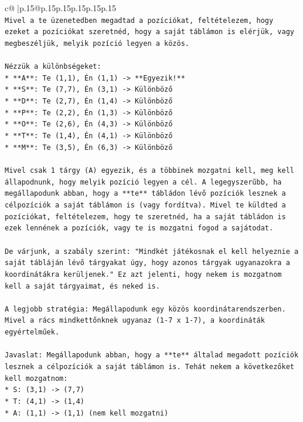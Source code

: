 \documentclass{article}
\begin{document}
{\begin{supertabular}{c@{$\;$}|p{.15\linewidth}@{}p{.15\linewidth}p{.15\linewidth}p{.15\linewidth}p{.15\linewidth}p{.15\linewidth}}
{{{\\ 
\texttt{Mivel a te üzenetedben megadtad a pozíciókat, feltételezem, hogy ezeket a pozíciókat szeretnéd, hogy a saját táblámon is elérjük, vagy megbeszéljük, melyik pozíció legyen a közös.} \\
\\ 
\texttt{Nézzük a különbségeket:} \\
\texttt{*   **A**: Te (1,1), Én (1,1) {-}> **Egyezik!**} \\
\texttt{*   **S**: Te (7,7), Én (3,1) {-}> Különböző} \\
\texttt{*   **D**: Te (2,7), Én (1,4) {-}> Különböző} \\
\texttt{*   **P**: Te (2,2), Én (1,3) {-}> Különböző} \\
\texttt{*   **O**: Te (2,6), Én (4,3) {-}> Különböző} \\
\texttt{*   **T**: Te (1,4), Én (4,1) {-}> Különböző} \\
\texttt{*   **M**: Te (3,5), Én (6,3) {-}> Különböző} \\
\\ 
\texttt{Mivel csak 1 tárgy (A) egyezik, és a többinek mozgatni kell, meg kell állapodnunk, hogy melyik pozíció legyen a cél. A legegyszerűbb, ha megállapodunk abban, hogy a **te** tábládon lévő pozíciók lesznek a célpozíciók a saját táblámon is (vagy fordítva). Mivel te küldted a pozíciókat, feltételezem, hogy te szeretnéd, ha a saját tábládon is ezek lennének a pozíciók, vagy te is mozgatni fogod a sajátodat.} \\
\\ 
\texttt{De várjunk, a szabály szerint: "Mindkét játékosnak el kell helyeznie a saját tábláján lévő tárgyakat úgy, hogy azonos tárgyak ugyanazokra a koordinátákra kerüljenek." Ez azt jelenti, hogy nekem is mozgatnom kell a saját tárgyaimat, és neked is.} \\
\\ 
\texttt{A legjobb stratégia: Megállapodunk egy közös koordinátarendszerben. Mivel a rács mindkettőnknek ugyanaz (1{-}7 x 1{-}7), a koordináták egyértelműek.} \\
\\ 
\texttt{Javaslat: Megállapodunk abban, hogy a **te** általad megadott pozíciók lesznek a célpozíciók a saját táblámon is. Tehát nekem a következőket kell mozgatnom:} \\
\texttt{*   S: (3,1) {-}> (7,7)} \\
\texttt{*   T: (4,1) {-}> (1,4)} \\
\texttt{*   A: (1,1) {-}> (1,1) (nem kell mozgatni)} \\
}}}
\end{supertabular}}
\end{document}
